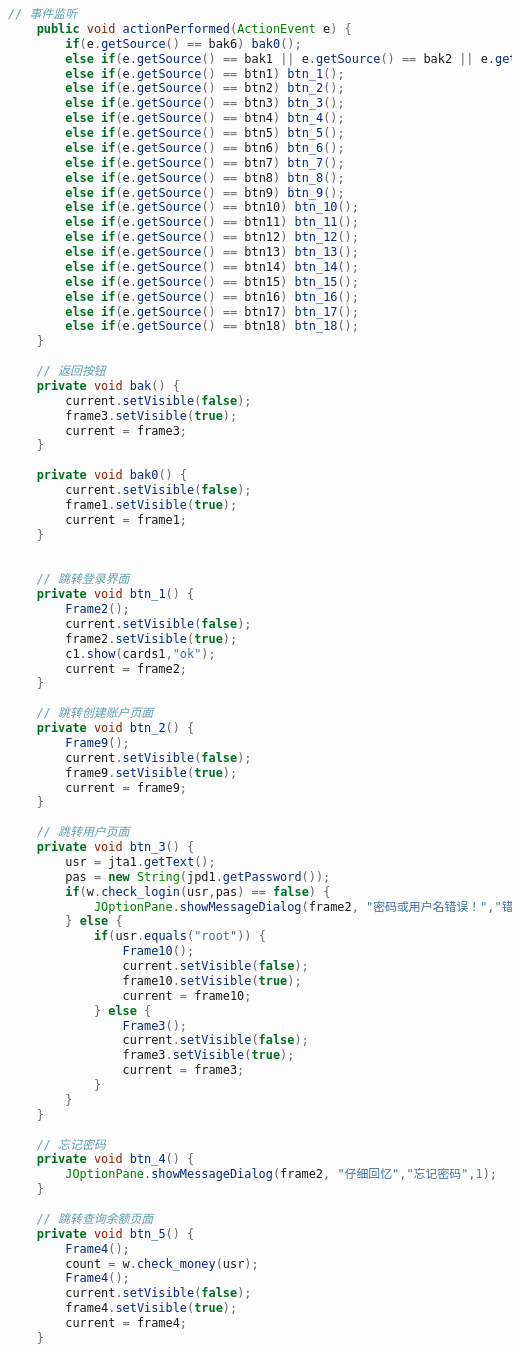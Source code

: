 \begin{lstlisting}[language = java, caption = UI.java]
	// 事件监听
	public void actionPerformed(ActionEvent e) {
		if(e.getSource() == bak6) bak0();
		else if(e.getSource() == bak1 || e.getSource() == bak2 || e.getSource() == bak3 || e.getSource() == bak4 || e.getSource() == bak5) bak();
		else if(e.getSource() == btn1) btn_1();
		else if(e.getSource() == btn2) btn_2();
		else if(e.getSource() == btn3) btn_3();
		else if(e.getSource() == btn4) btn_4();
		else if(e.getSource() == btn5) btn_5();
		else if(e.getSource() == btn6) btn_6();
		else if(e.getSource() == btn7) btn_7();
		else if(e.getSource() == btn8) btn_8();
		else if(e.getSource() == btn9) btn_9();
		else if(e.getSource() == btn10) btn_10();
		else if(e.getSource() == btn11) btn_11();
		else if(e.getSource() == btn12) btn_12();
		else if(e.getSource() == btn13) btn_13();
		else if(e.getSource() == btn14) btn_14();
		else if(e.getSource() == btn15) btn_15();
		else if(e.getSource() == btn16) btn_16();
		else if(e.getSource() == btn17) btn_17();
		else if(e.getSource() == btn18) btn_18();
	}
	
	// 返回按钮
	private void bak() {
		current.setVisible(false);
		frame3.setVisible(true);
		current = frame3;
	}
	
	private void bak0() {
		current.setVisible(false);
		frame1.setVisible(true);
		current = frame1;
	}
	
	
	// 跳转登录界面
	private void btn_1() {
		Frame2();
		current.setVisible(false);
		frame2.setVisible(true);
		c1.show(cards1,"ok");
		current = frame2;
	}
	
	// 跳转创建账户页面
	private void btn_2() {
		Frame9();
		current.setVisible(false);
		frame9.setVisible(true);
		current = frame9;
	}
	
	// 跳转用户页面
	private void btn_3() {
		usr = jta1.getText();
		pas = new String(jpd1.getPassword());
		if(w.check_login(usr,pas) == false) {
			JOptionPane.showMessageDialog(frame2, "密码或用户名错误！","错误",2);
		} else {
			if(usr.equals("root")) {
				Frame10();
				current.setVisible(false);
				frame10.setVisible(true);
				current = frame10;
			} else {
				Frame3();
				current.setVisible(false);
				frame3.setVisible(true);
				current = frame3;
			}
		}
	}
	
	// 忘记密码
	private void btn_4() {
		JOptionPane.showMessageDialog(frame2, "仔细回忆","忘记密码",1);
	}
	
	// 跳转查询余额页面
	private void btn_5() {
		Frame4();
		count = w.check_money(usr);
		Frame4();
		current.setVisible(false);
		frame4.setVisible(true);
		current = frame4;
	}
	

\end{lstlisting}
